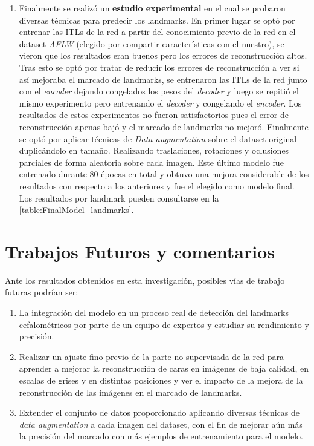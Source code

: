 \begin{enumerate}
    \item Finalmente se realizó un \textbf{estudio experimental} en el cual se probaron diversas técnicas para predecir los landmarks. En primer lugar se optó por entrenar las ITLs de la red a partir del conocimiento previo de la red en el dataset \textit{AFLW} (elegido por compartir características con el nuestro), se vieron que los resultados eran buenos pero los errores de reconstrucción altos. Tras esto se optó por tratar de reducir los errores de reconstrucción a ver si así mejoraba el marcado de landmarks, se entrenaron las ITLs de la red junto con el \textit{encoder} dejando congelados los pesos del \textit{decoder} y luego se repitió el mismo experimento pero entrenando el \textit{decoder} y congelando el \textit{encoder}. Los resultados de estos experimentos no fueron satisfactorios pues el error de reconstrucción apenas bajó y el marcado de landmarks no mejoró. Finalmente se optó por aplicar técnicas de \textit{Data augmentation} sobre el dataset original duplicándolo en tamaño. Realizando traslaciones, rotaciones y oclusiones parciales de forma aleatoria sobre cada imagen. Este último modelo fue entrenado durante $80$ épocas en total y obtuvo una mejora considerable de los resultados con respecto a los anteriores y fue el elegido como modelo final. Los resultados por landmark pueden consultarse en la \autoref{table:FinalModel_landmarks}.
\end{enumerate}


\section{Trabajos Futuros y comentarios}

\noindent Ante los resultados obtenidos en esta investigación, posibles vías de trabajo futuras podrían ser:

\begin{enumerate}
    \item La integración del modelo en un proceso real de detección del landmarks cefalométricos por parte de un equipo de expertos y estudiar su rendimiento y precisión.
    \item Realizar un ajuste fino previo de la parte no supervisada de la red para aprender a mejorar la reconstrucción de caras en imágenes de baja calidad, en escalas de grises y en distintas posiciones y ver el impacto de la mejora de la reconstrucción de las imágenes en el marcado de landmarks.
    \item Extender el conjunto de datos proporcionado aplicando diversas técnicas de \textit{data augmentation} a cada imagen del dataset, con el fin de mejorar aún más la precisión del marcado con más ejemplos de entrenamiento para el modelo.
\end{enumerate}


